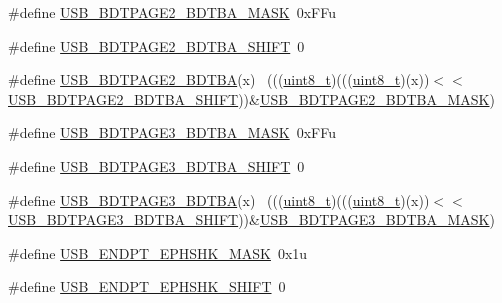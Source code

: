 \begin{DoxyCompactItemize}
\item 
\#define \hyperlink{group___u_s_b___register___masks_ga69407c90a73a26bc60f3f9b75e4bd7c0}{U\+S\+B\+\_\+\+B\+D\+T\+P\+A\+G\+E2\+\_\+\+B\+D\+T\+B\+A\+\_\+\+M\+A\+SK}~0x\+F\+Fu
\item 
\#define \hyperlink{group___u_s_b___register___masks_gae67d0252b1559f854264f0fe52ff6fb5}{U\+S\+B\+\_\+\+B\+D\+T\+P\+A\+G\+E2\+\_\+\+B\+D\+T\+B\+A\+\_\+\+S\+H\+I\+FT}~0
\item 
\#define \hyperlink{group___u_s_b___register___masks_gad5986a409593f83555e8141e3d569e5f}{U\+S\+B\+\_\+\+B\+D\+T\+P\+A\+G\+E2\+\_\+\+B\+D\+T\+BA}(x)                                    ~(((\hyperlink{_p_e___types_8h_aba7bc1797add20fe3efdf37ced1182c5}{uint8\+\_\+t})(((\hyperlink{_p_e___types_8h_aba7bc1797add20fe3efdf37ced1182c5}{uint8\+\_\+t})(x))$<$$<$\hyperlink{group___u_s_b___register___masks_gae67d0252b1559f854264f0fe52ff6fb5}{U\+S\+B\+\_\+\+B\+D\+T\+P\+A\+G\+E2\+\_\+\+B\+D\+T\+B\+A\+\_\+\+S\+H\+I\+FT}))\&\hyperlink{group___u_s_b___register___masks_ga69407c90a73a26bc60f3f9b75e4bd7c0}{U\+S\+B\+\_\+\+B\+D\+T\+P\+A\+G\+E2\+\_\+\+B\+D\+T\+B\+A\+\_\+\+M\+A\+SK})
\item 
\#define \hyperlink{group___u_s_b___register___masks_ga9081479345a744c85a74643600921b64}{U\+S\+B\+\_\+\+B\+D\+T\+P\+A\+G\+E3\+\_\+\+B\+D\+T\+B\+A\+\_\+\+M\+A\+SK}~0x\+F\+Fu
\item 
\#define \hyperlink{group___u_s_b___register___masks_ga9850caac94013a6e84f9af9cbe0e0827}{U\+S\+B\+\_\+\+B\+D\+T\+P\+A\+G\+E3\+\_\+\+B\+D\+T\+B\+A\+\_\+\+S\+H\+I\+FT}~0
\item 
\#define \hyperlink{group___u_s_b___register___masks_ga0fc3ca4bec40401b13e753b772a5a956}{U\+S\+B\+\_\+\+B\+D\+T\+P\+A\+G\+E3\+\_\+\+B\+D\+T\+BA}(x)                                    ~(((\hyperlink{_p_e___types_8h_aba7bc1797add20fe3efdf37ced1182c5}{uint8\+\_\+t})(((\hyperlink{_p_e___types_8h_aba7bc1797add20fe3efdf37ced1182c5}{uint8\+\_\+t})(x))$<$$<$\hyperlink{group___u_s_b___register___masks_ga9850caac94013a6e84f9af9cbe0e0827}{U\+S\+B\+\_\+\+B\+D\+T\+P\+A\+G\+E3\+\_\+\+B\+D\+T\+B\+A\+\_\+\+S\+H\+I\+FT}))\&\hyperlink{group___u_s_b___register___masks_ga9081479345a744c85a74643600921b64}{U\+S\+B\+\_\+\+B\+D\+T\+P\+A\+G\+E3\+\_\+\+B\+D\+T\+B\+A\+\_\+\+M\+A\+SK})
\item 
\#define \hyperlink{group___u_s_b___register___masks_ga9266b40af26177a6659041e0229e76e7}{U\+S\+B\+\_\+\+E\+N\+D\+P\+T\+\_\+\+E\+P\+H\+S\+H\+K\+\_\+\+M\+A\+SK}~0x1u
\item 
\#define \hyperlink{group___u_s_b___register___masks_ga477c6b1ea91137b6ebd65d0574a7b611}{U\+S\+B\+\_\+\+E\+N\+D\+P\+T\+\_\+\+E\+P\+H\+S\+H\+K\+\_\+\+S\+H\+I\+FT}~0

\end{DoxyCompactItemize}
